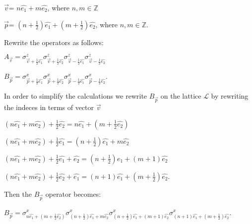 \documentclass{Configuration_Files/PoliMi3i_thesis}
\begin{document}
\begin{center}
	$\vec{v}$= $n\hat{e_1} + m\hat{e_2}$, where $n,m \in \mathbb{Z}$ 
	
	$\vec{p}$= $(n + \frac{1}{2}) \hat{e_1} + (m + \frac{1}{2}) \hat{e_2}$, where $n,m \in \mathbb{Z}$.
\end{center}

Rewrite the operators as follows: \newline

\begin{center}
	
	$A_{\vec{v}} = \sigma^z_{\vec{v}+\frac{1}{2}\hat{e_1}} \sigma^z_{\vec{v}+\frac{1}{2}\hat{e_2}} \sigma^z_{\vec{v}-\frac{1}{2}\hat{e_1}} \sigma^z_{\vec{v}-\frac{1}{2}\hat{e_2}}$ 
	
	$B_{\vec{p}} = \sigma^x_{\vec{p}+\frac{1}{2}\hat{e_1}} \sigma^x_{\vec{p}+\frac{1}{2}\hat{e_2}} \sigma^x_{\vec{p}-\frac{1}{2}\hat{e_1}} \sigma^x_{\vec{p}-\frac{1}{2}\hat{e_2}}$.
	
\end{center}

In order to simplify the calculations we rewrite $B_{\vec{p}}$ on the lattice $\mathcal{L}$ by rewriting the indeces in terms of vector $\vec{v}$ \newline

\begin{center}
	$(n\hat{e_1} + m\hat{e_2}) + \frac{1}{2}\hat{e_2}= n\hat{e_1} + (m+\frac{1}{2}\hat{e_2})$
	
	$(n\hat{e_1} + m\hat{e_2}) + \frac{1}{2}\hat{e_1}= (n+ \frac{1}{2})\hat{e_1} + m\hat{e_2}$
	
	$(n\hat{e_1} + m\hat{e_2}) + \frac{1}{2}\hat{e_1}+\hat{e_2}= (n+ \frac{1}{2})\hat{e_1} + (m + 1)\hat{e_2}$
	
	$(n\hat{e_1} + m\hat{e_2}) + \frac{1}{2}\hat{e_2}+\hat{e_1}= (n+ 1)\hat{e_1} + (m + \frac{1}{2})\hat{e_2}$.
\end{center}


Then the $B_{\vec{p}}$ operator becomes: \newline

\begin{center}
	
	$B_{\vec{p}} = \sigma^x_{n\hat{e_1} + (m+\frac{1}{2}\hat{e_2})} \sigma^x_{(n+ \frac{1}{2})\hat{e_1} + m\hat{e_2}} \sigma^x_{(n+ \frac{1}{2})\hat{e_1} + (m + 1)\hat{e_2}} \sigma^x_{(n+ 1)\hat{e_1} + (m + \frac{1}{2})\hat{e_2}}$. \newline
	
\end{center}
\end{document}
